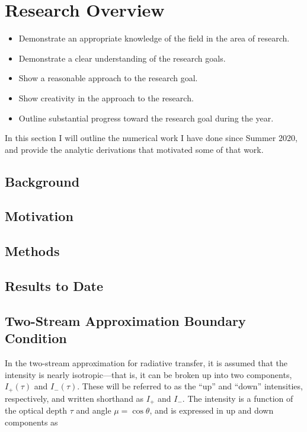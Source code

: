 \documentclass[onecolumn]{aastex63}
\begin{document}

\section{Research Overview}

\begin{itemize}
    \item Demonstrate an appropriate knowledge of the field in the area of research.
    \item Demonstrate a clear understanding of the research goals.
    \item Show a reasonable approach to the research goal.
    \item Show creativity in the approach to the research.
    \item Outline substantial progress toward the research goal during the year.
\end{itemize}


In this section I will outline the numerical work I have done since Summer 2020, and provide the analytic derivations that motivated some of that work.

\subsection{Background}

\subsection{Motivation}

\subsection{Methods}

\subsection{Results to Date}

\subsection{Two-Stream Approximation Boundary Condition}

In the two-stream approximation for radiative transfer, it is assumed that the intensity is nearly isotropic---that is, it can be broken up into two components, $I_+(\tau)$ and $I_-(\tau)$. These will be referred to as the ``up'' and ``down'' intensities, respectively, and written shorthand as $I_+$ and $I_-$. The intensity is a function of the optical depth $\tau$ and angle $\mu = \cos{\theta}$, and is expressed in up and down components as
\end{document}
